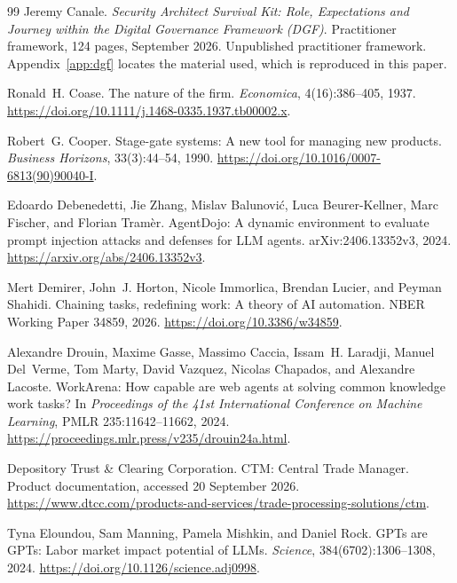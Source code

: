 \begin{thebibliography}{99}
Jeremy Canale.
\newblock \emph{Security Architect Survival Kit: Role, Expectations and Journey within the Digital
Governance Framework (DGF)}.
\newblock Practitioner framework, 124 pages, September 2026.
\newblock Unpublished practitioner framework. Appendix~\ref{app:dgf} locates the material used, which is reproduced in this paper.

Ronald~H. Coase.
\newblock The nature of the firm.
\newblock \emph{Economica}, 4(16):386--405, 1937.
\newblock \url{https://doi.org/10.1111/j.1468-0335.1937.tb00002.x}.

Robert~G. Cooper.
\newblock Stage-gate systems: A new tool for managing new products.
\newblock \emph{Business Horizons}, 33(3):44--54, 1990.
\newblock \url{https://doi.org/10.1016/0007-6813(90)90040-I}.

Edoardo Debenedetti, Jie Zhang, Mislav Balunovi\'c, Luca Beurer-Kellner, Marc Fischer, and Florian Tram\`er.
\newblock AgentDojo: A dynamic environment to evaluate prompt injection attacks and defenses for LLM agents.
\newblock arXiv:2406.13352v3, 2024.
\newblock \url{https://arxiv.org/abs/2406.13352v3}.

Mert Demirer, John~J. Horton, Nicole Immorlica, Brendan Lucier, and Peyman Shahidi.
\newblock Chaining tasks, redefining work: A theory of AI automation.
\newblock NBER Working Paper 34859, 2026.
\newblock \url{https://doi.org/10.3386/w34859}.

Alexandre Drouin, Maxime Gasse, Massimo Caccia, Issam~H. Laradji, Manuel Del~Verme, Tom Marty,
David Vazquez, Nicolas Chapados, and Alexandre Lacoste.
\newblock WorkArena: How capable are web agents at solving common knowledge work tasks?
\newblock In \emph{Proceedings of the 41st International Conference on Machine Learning}, PMLR
235:11642--11662, 2024.
\newblock \url{https://proceedings.mlr.press/v235/drouin24a.html}.

Depository Trust \& Clearing Corporation.
\newblock CTM: Central Trade Manager. Product documentation, accessed 20 September 2026.
\newblock \url{https://www.dtcc.com/products-and-services/trade-processing-solutions/ctm}.

Tyna Eloundou, Sam Manning, Pamela Mishkin, and Daniel Rock.
\newblock GPTs are GPTs: Labor market impact potential of LLMs.
\newblock \emph{Science}, 384(6702):1306--1308, 2024.
\newblock \url{https://doi.org/10.1126/science.adj0998}.


\end{thebibliography}
